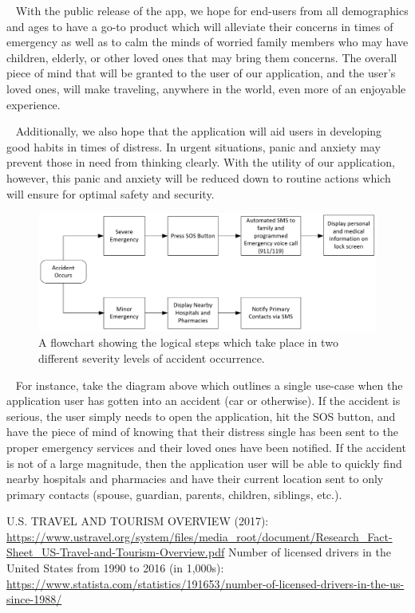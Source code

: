 \documentclass[10pt, a4paper]{article}
\begin{document}
\par ~ With the public release of the app, we hope for end-users from all demographics and ages to have a go-to product which will alleviate their concerns in times of emergency as well as to calm the minds of worried family members who may have children, elderly, or other loved ones that may bring them concerns. The overall piece of mind that will be granted to the user of our application, and the user's loved ones, will make traveling, anywhere in the world, even more of an enjoyable experience.

\par ~ Additionally, we also hope that the application will aid users in developing good habits in times of distress. In urgent situations, panic and anxiety may prevent those in need from thinking clearly. With the utility of our application, however, this panic and anxiety will be reduced down to routine actions which will ensure for optimal safety and security.

	\begin{figure}[H]
	\begin{center}	
	\includegraphics[scale=.40]{accident-flowchart.PNG}
	\caption{A flowchart showing the logical steps which take place in two different severity levels of accident occurrence.}
	\label{fig:1}	
	\end{center}	
	\end{figure}
	
\par ~ For instance, take the diagram above which outlines a single use-case when the application user has gotten into an accident (car or otherwise). If the accident is serious, the user simply needs to open the application, hit the SOS button, and have the piece of mind of knowing that their distress single has been sent to the proper emergency services and their loved ones have been notified. If the accident is not of a large magnitude, then the application user will be able to quickly find nearby hospitals and pharmacies and have their current location sent to only primary contacts (spouse, guardian, parents, children, siblings, etc.).
	
\begin{thebibliography}{9}
U.S. TRAVEL AND TOURISM OVERVIEW (2017): \url{https://www.ustravel.org/system/files/media_root/document/Research_Fact-Sheet_US-Travel-and-Tourism-Overview.pdf}
Number of licensed drivers in the United States from 1990 to 2016 (in 1,000s): \url{https://www.statista.com/statistics/191653/number-of-licensed-drivers-in-the-us-since-1988/}
\end{thebibliography}
\end{document}
